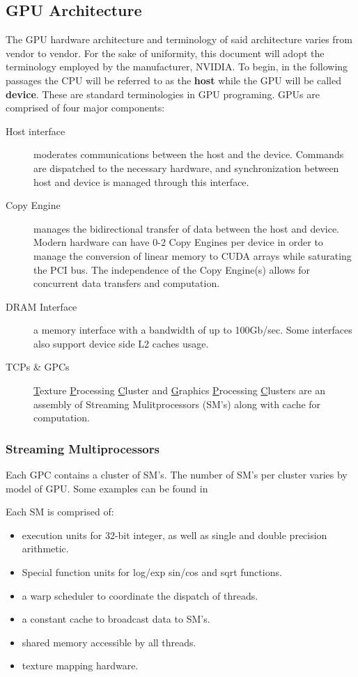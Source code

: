 \subsection{GPU Architecture}
The GPU hardware architecture and terminology of said architecture varies from
vendor to vendor.  For the sake of uniformity, this document will adopt the
terminology employed by the manufacturer, NVIDIA.  To begin, in the following passages the CPU
will be referred to as the \textbf{host} while the GPU will be called \textbf{device}.
These are standard terminologies in GPU programing. GPUs are comprised of four major components:
\begin{description}
  \item[Host interface] moderates communications between the host and the device.
  Commands are dispatched to the necessary hardware, and synchronization between
  host and device is managed through this interface.
  \item[Copy Engine] manages the bidirectional transfer of data between the host
  and device.  Modern hardware can have 0-2 Copy Engines per device in order to
  manage the conversion of linear memory to CUDA arrays while saturating the PCI
  bus.  The independence of the Copy Engine(s) allows for concurrent data transfers
  and computation.
  \item[DRAM Interface] a memory interface with a bandwidth of up to 100Gb/sec.
  Some interfaces also support device side L2 caches usage.
  \item[TCPs \& GPCs] \underline{T}exture \underline{P}rocessing \underline{C}luster
  and \underline{G}raphics \underline{P}rocessing \underline{C}lusters are an assembly
  of Streaming Mulitprocessors (SM's) along with cache for computation.
\end{description}\cite{Wilt}

\subsubsection{Streaming Multiprocessors}
Each GPC contains a cluster of SM's.  The number of SM's per cluster varies by
model of GPU. Some examples can be found in %


Each SM is comprised of: \cite{Wilt}
\begin{itemize}
  \item execution units for 32-bit integer, as well as single and double precision arithmetic.
  \item Special function units for log/exp sin/cos and sqrt functions.
  \item a warp scheduler to coordinate the dispatch of threads.
  \item a constant cache to broadcast data to SM's.
  \item shared memory accessible by all threads.
  \item texture mapping hardware.
\end{itemize}

